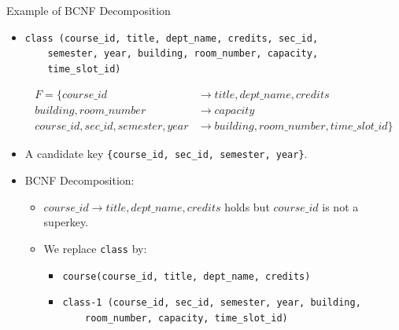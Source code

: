 \documentclass{beamer}
\begin{document}
\begin{frame}[fragile]{Example of BCNF Decomposition}
    \footnotesize
    \begin{itemize}
        \item
            \begin{verbatim}
class (course_id, title, dept_name, credits, sec_id,
    semester, year, building, room_number, capacity,
    time_slot_id)
            \end{verbatim}
            \vspace{-8mm}
            \begin{equation*}
                \begin{align*}
                    F = \{
                        course\_id &\rightarrow title, dept\_name, credits \\
                        building, room\_number &\rightarrow capacity \\
                        course\_id, sec\_id, semester, year &\rightarrow building, room\_number, time\_slot\_id \}
                \end{align*}
            \end{equation*}
        \item A candidate key \verb|{course_id, sec_id, semester, year}|.
        \item BCNF Decomposition:
            \begin{itemize}
                \item $course\_id \rightarrow title, dept\_name, credits$ holds but $course\_id$ is not a superkey.
                \item We replace \texttt{class} by:
                    \begin{itemize}
                        \item \verb|course(course_id, title, dept_name, credits)|
                        \item \begin{verbatim}
class-1 (course_id, sec_id, semester, year, building,
    room_number, capacity, time_slot_id)
                            \end{verbatim}
                    \end{itemize}
            \end{itemize}
    \end{itemize}
\end{frame}
\end{document}
